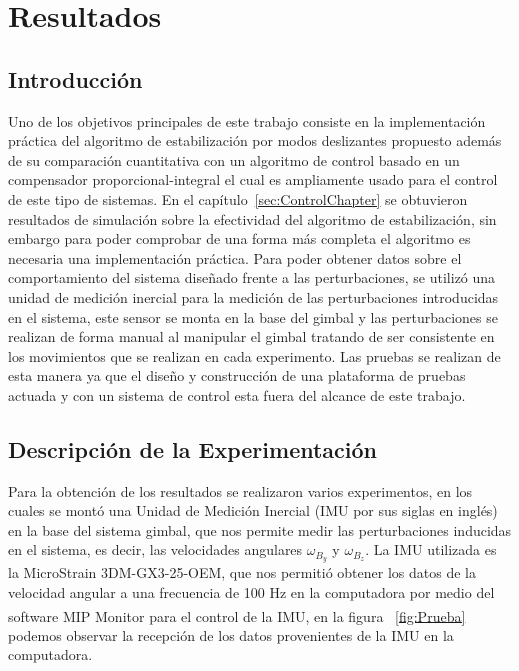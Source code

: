 \chapter{Resultados}

\section{Introducci\'{o}n}

Uno de los objetivos principales de este trabajo consiste en la implementaci\'{o}n pr\'{a}ctica del algoritmo de estabilizaci\'{o}n por modos deslizantes propuesto adem\'{a}s de su comparaci\'{o}n cuantitativa con un algoritmo de control basado en un compensador proporcional-integral el cual es ampliamente usado para el control de este tipo de sistemas. En el cap\'{i}tulo~\ref{sec:ControlChapter} se obtuvieron resultados de simulaci\'{o}n sobre la efectividad del algoritmo de estabilizaci\'{o}n, sin embargo para poder comprobar de una forma m\'{a}s completa el algoritmo es necesaria una implementaci\'{o}n pr\'{a}ctica. Para poder obtener datos sobre el comportamiento del sistema dise\~{n}ado frente a las perturbaciones, se utiliz\'{o} una unidad de medici\'{o}n inercial para la medici\'{o}n de las perturbaciones introducidas en el sistema, este sensor se monta en la base del gimbal y las perturbaciones se realizan de forma manual al manipular el gimbal tratando de ser consistente en los movimientos que se realizan en cada experimento. Las pruebas se realizan de esta manera ya que el dise\~{n}o y construcci\'{o}n de una plataforma de pruebas actuada y con un sistema de control esta fuera del alcance de este trabajo.



\section{Descripci\'{o}n de la Experimentaci\'{o}n}

Para la obtenci\'{o}n de los resultados se realizaron varios experimentos, en los cuales se mont\'{o} una Unidad de Medici\'{o}n Inercial (IMU por sus siglas en ingl\'{e}s) en la base del sistema gimbal, que nos permite medir las perturbaciones inducidas en el sistema, es decir, las velocidades angulares $\omega _{B_y}$ y $\omega _{B_z}$. La IMU utilizada es la MicroStrain 3DM-GX3-25-OEM, que nos permiti\'{o} obtener los datos de la velocidad angular a una frecuencia de 100 Hz en la computadora por medio del software MIP\textsuperscript{\textregistered} Monitor para el control de la IMU, en la figura ~\ref{fig:Prueba} podemos observar la recepci\'{o}n de los datos provenientes de la IMU en la computadora.   

